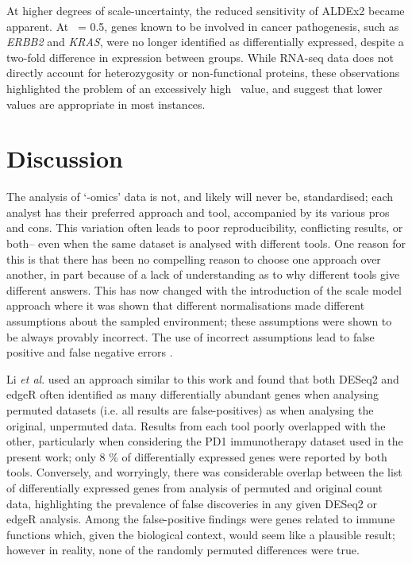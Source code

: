 \documentclass[10pt,letterpaper]{article}
\begin{document}
At higher degrees of scale-uncertainty, the reduced sensitivity of ALDEx2 became apparent. At \textgamma~= 0.5, genes known to be involved in cancer pathogenesis, such as \textit{ERBB2} and \textit{KRAS}, were no longer identified as differentially expressed, despite a two-fold difference in expression between groups. While RNA-seq data does not directly account for heterozygosity or non-functional proteins, these observations highlighted the problem of an excessively high \textgamma~value, and suggest that lower values are appropriate in most instances.


\section*{Discussion}

The analysis of `-omics' data is not, and likely will never be, standardised; each analyst has their preferred approach and tool, accompanied by its various pros and cons. This variation often leads to poor reproducibility, conflicting results, or both-- even when the same dataset is analysed with different tools. One reason for this is that there has been no compelling reason to choose one approach over another, in part because of a lack of understanding as to why different tools give different answers. This has now changed with the introduction of the scale model approach  \cite{nixon_scale_2024} where it was shown that different normalisations made different assumptions about the sampled environment; these assumptions were shown to be always provably incorrect. The use of incorrect assumptions lead to false positive and false negative errors \cite{nixon_scale_2024, nixon_incorporating_2025, gloor_explicit_2025, mcgovern_replacing_2025}.

Li \textit{et al}. \cite{li_exaggerated_2022} used an approach similar to this work and found that both DESeq2 and edgeR often identified as many differentially abundant genes when analysing permuted datasets (i.e. all results are false-positives) as when analysing the original, unpermuted data. Results from each tool poorly overlapped with the other, particularly when considering the PD1 immunotherapy dataset used in the present work; only 8 \% of differentially expressed genes were reported by both tools. Conversely, and worryingly, there was considerable overlap between the list of differentially expressed genes from analysis of permuted and original count data, highlighting the prevalence of false discoveries in any given DESeq2 or edgeR analysis. Among the false-positive findings were genes related to immune functions which, given the biological context, would seem like a plausible result; however in reality, none of the randomly permuted differences were true.
\end{document}
